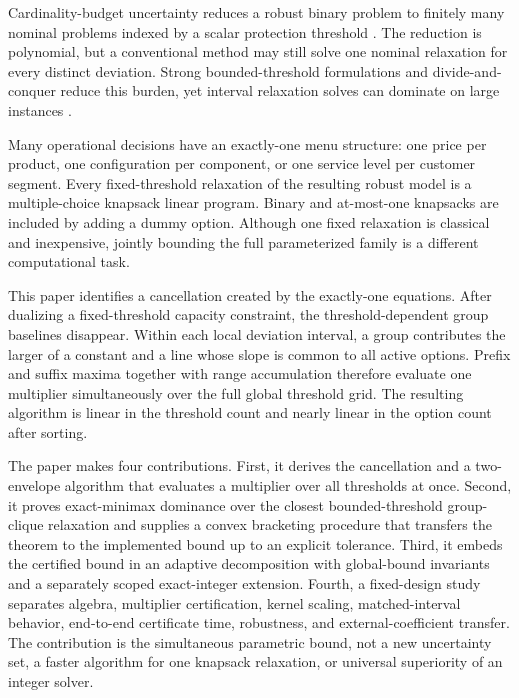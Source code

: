 \documentclass[11pt]{article}
\theoremstyle{plain}
\theoremstyle{definition}
\theoremstyle{remark}
\begin{document}
Cardinality-budget uncertainty reduces a robust binary problem to finitely many nominal problems indexed by a scalar protection threshold \citep{BertsimasSim2003,BertsimasSim2004}.  The reduction is polynomial, but a conventional method may still solve one nominal relaxation for every distinct deviation.  Strong bounded-threshold formulations and divide-and-conquer reduce this burden, yet interval relaxation solves can dominate on large instances \citep{AlvarezMiranda2013,Hansknecht2018,BusingGersingKoster2023}.

Many operational decisions have an exactly-one menu structure: one price per product, one configuration per component, or one service level per customer segment.  Every fixed-threshold relaxation of the resulting robust model is a multiple-choice knapsack linear program.  Binary and at-most-one knapsacks are included by adding a dummy option.  Although one fixed relaxation is classical and inexpensive, jointly bounding the full parameterized family is a different computational task.

This paper identifies a cancellation created by the exactly-one equations.  After dualizing a fixed-threshold capacity constraint, the threshold-dependent group baselines disappear.  Within each local deviation interval, a group contributes the larger of a constant and a line whose slope is common to all active options.  Prefix and suffix maxima together with range accumulation therefore evaluate one multiplier simultaneously over the full global threshold grid.  The resulting algorithm is linear in the threshold count and nearly linear in the option count after sorting.

The paper makes four contributions.  First, it derives the cancellation and a two-envelope algorithm that evaluates a multiplier over all thresholds at once.  Second, it proves exact-minimax dominance over the closest bounded-threshold group-clique relaxation and supplies a convex bracketing procedure that transfers the theorem to the implemented bound up to an explicit tolerance.  Third, it embeds the certified bound in an adaptive decomposition with global-bound invariants and a separately scoped exact-integer extension.  Fourth, a fixed-design study separates algebra, multiplier certification, kernel scaling, matched-interval behavior, end-to-end certificate time, robustness, and external-coefficient transfer.  The contribution is the simultaneous parametric bound, not a new uncertainty set, a faster algorithm for one knapsack relaxation, or universal superiority of an integer solver.
\end{document}

